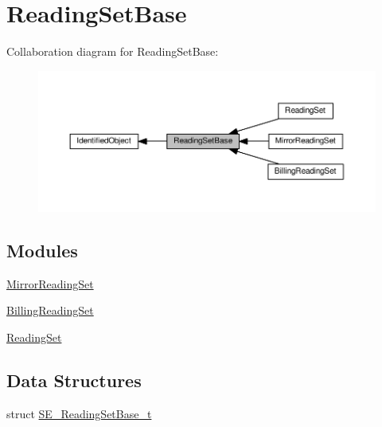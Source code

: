 \hypertarget{group__ReadingSetBase}{}\section{Reading\+Set\+Base}
\label{group__ReadingSetBase}
Collaboration diagram for Reading\+Set\+Base\+:\nopagebreak
\begin{figure}[H]
\begin{center}
\leavevmode
\includegraphics[width=350pt]{group__ReadingSetBase}
\end{center}
\end{figure}
\subsection*{Modules}
\begin{DoxyCompactItemize}
\item 
\hyperlink{group__MirrorReadingSet}{Mirror\+Reading\+Set}
\item 
\hyperlink{group__BillingReadingSet}{Billing\+Reading\+Set}
\item 
\hyperlink{group__ReadingSet}{Reading\+Set}
\end{DoxyCompactItemize}
\subsection*{Data Structures}
\begin{DoxyCompactItemize}
\item 
struct \hyperlink{structSE__ReadingSetBase__t}{S\+E\+\_\+\+Reading\+Set\+Base\+\_\+t}
\end{DoxyCompactItemize}
